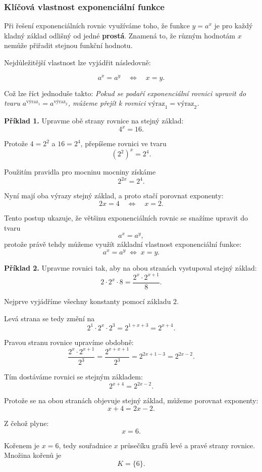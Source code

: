 \documentclass[12pt,a4paper]{article}
\begin{document}
\subsubsection*{Klíčová vlastnost exponenciální funkce}

Při řešení exponenciálních rovnic využíváme toho, že funkce $y=a^x$ je pro každý
kladný základ odlišný od jedné \textbf{prostá}. Znamená to, že různým hodnotám $x$
nemůže přiřadit stejnou funkční hodnotu.

Nejdůležitější vlastnost lze vyjádřit následovně:

\begin{definitionbox}
\[
    a^x = a^y \quad \Longleftrightarrow \quad x = y.
\]
\end{definitionbox}

Což lze říct jednoduše takto:  
\emph{Pokud se podaří exponenciální rovnici upravit do tvaru $a^{\text{výraz}_1} = a^{\text{výraz}_2}$, můžeme přejít 
k rovnici $\text{výraz}_1 = \text{výraz}_2$.}

\begin{examplebox}
\textbf{Příklad 1.}  
Upravme obě strany rovnice na stejný základ:
\[
    4^x = 16.
\]

Protože $4 = 2^2$ a $16 = 2^4$, přepíšeme rovnici ve tvaru
\[
    (2^2)^x = 2^4.
\]

Použitím pravidla pro mocninu mocniny získáme
\[
    2^{2x} = 2^4.
\]

Nyní mají oba výrazy stejný základ, a proto stačí porovnat exponenty:
\[
    2x = 4 \quad \Longleftrightarrow \quad x = 2.
\]
\end{examplebox}

\begin{notebox}
Tento postup ukazuje, že většinu exponenciálních rovnic se snažíme upravit do tvaru
\[
    a^x = a^y,
\]
protože právě tehdy můžeme využít základní vlastnost exponenciální funkce:
\[
    a^x = a^y \;\Longleftrightarrow\; x = y.
\]
\end{notebox}

\begin{examplebox}
\textbf{Příklad 2.}  
Upravme rovnici tak, aby na obou stranách vystupoval stejný základ:
\[
    2 \cdot 2^x \cdot 8 = \frac{2^x \cdot 2^{x+1}}{8}.
\]

Nejprve vyjádříme všechny konstanty pomocí základu $2$.

Levá strana se tedy změní na
\[
    2^1 \cdot 2^x \cdot 2^3 = 2^{1 + x + 3} = 2^{x+4}.
\]

Pravou stranu rovnice upravíme obdobně:
\[
    \frac{2^x \cdot 2^{x+1}}{2^3}
    = \frac{2^{x + x + 1}}{2^3}
    = 2^{2x + 1 - 3}
    = 2^{2x - 2}.
\]

Tím dostáváme rovnici se stejným základem:
\[
    2^{x+4} = 2^{2x-2}.
\]

Protože se na obou stranách objevuje stejný základ, můžeme porovnat exponenty:
\[
    x + 4 = 2x - 2.
\]

Z čehož plyne:
\[
    x = 6.
\]

Kořenem je $x=6$, tedy souřadnice $x$ průsečíku grafů levé a pravé strany rovnice.
Množina kořenů je
\[
K = \{6\}.
\]
\end{examplebox}
\end{document}

